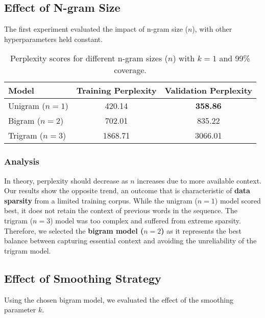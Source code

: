 \documentclass[a4paper]{article}
\begin{document}
\subsection{Effect of N-gram Size}
The first experiment evaluated the impact of n-gram size ($n$), with other hyperparameters held constant.

\begin{table}[h!]
  \centering
  \begin{tabular}{|l|c|c|}
    \hline
    \textbf{Model}  & \textbf{Training Perplexity} & \textbf{Validation Perplexity} \\
    \hline
    Unigram ($n=1$) & 420.14                       & \textbf{358.86}                \\
    Bigram ($n=2$)  & 702.01                       & 835.22                         \\
    Trigram ($n=3$) & 1868.71                      & 3066.01                        \\
    \hline
  \end{tabular}
  \caption{Perplexity scores for different n-gram sizes ($n$) with $k=1$ and 99\% coverage.}
  \label{tab:ngram_perplexity}
\end{table}

\subsubsection{Analysis}
In theory, perplexity should decrease as $n$ increases due to more available context. Our results show the opposite trend, an outcome that is characteristic of \textbf{data sparsity} from a limited training corpus. While the unigram ($n=1$) model scored best, it does not retain the context of previous words in the sequence. The trigram ($n=3$) model was too complex and suffered from extreme sparsity. Therefore, we selected the \textbf{bigram model ($n=2$)} as it represents the best balance between capturing essential context and avoiding the unreliability of the trigram model.

\subsection{Effect of Smoothing Strategy}
Using the chosen bigram model, we evaluated the effect of the smoothing parameter $k$.
\end{document}
